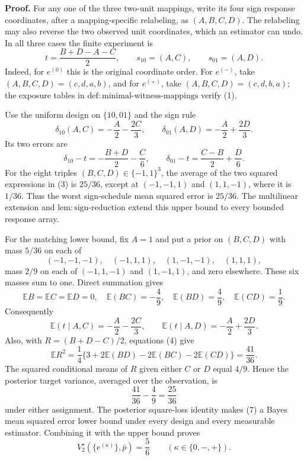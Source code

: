 \textbf{Proof.}
For any one of the three two-unit mappings, write its four sign response coordinates, after a mapping-specific relabeling, as \((A,B,C,D)\). The relabeling may also reverse the two observed unit coordinates, which an estimator can undo. In all three cases the finite experiment is
\[
 t=\frac{B+D-A-C}{2},\qquad
 s_{10}=(A,C),\qquad s_{01}=(A,D). \tag{1}
\]
Indeed, for \(e^{(0)}\) this is the original coordinate order. For \(e^{(-)}\), take \((A,B,C,D)=(c,d,a,b)\), and for \(e^{(+)}\), take \((A,B,C,D)=(c,d,b,a)\); the exposure tables in \(\mathrm{def{:}minimal\text{-}witness\text{-}mappings}\) verify (1).

Use the uniform design on \(\{10,01\}\) and the sign rule
\[
 \delta_{10}(A,C)=-\frac A2-\frac{2C}{3},
 \qquad
 \delta_{01}(A,D)=-\frac A2+\frac{2D}{3}. \tag{2}
\]
Its two errors are
\[
 \delta_{10}-t=-\frac{B+D}{2}-\frac C6,
 \qquad
 \delta_{01}-t=\frac{C-B}{2}+\frac D6. \tag{3}
\]
For the eight triples \((B,C,D)\in\{-1,1\}^3\), the average of the two squared expressions in (3) is \(25/36\), except at \((-1,-1,1)\) and \((1,1,-1)\), where it is \(1/36\). Thus the worst sign-schedule mean squared error is \(25/36\). The multilinear extension and \(\mathrm{lem{:}sign\text{-}reduction}\) extend this upper bound to every bounded response array.

For the matching lower bound, fix \(A=1\) and put a prior on \((B,C,D)\) with mass \(5/36\) on each of
\[
 (-1,-1,-1),\quad(-1,1,1),\quad(1,-1,-1),\quad(1,1,1),
\]
mass \(2/9\) on each of \((-1,1,-1)\) and \((1,-1,1)\), and zero elsewhere. These six masses sum to one. Direct summation gives
\[
 \mathbb E B=\mathbb E C=\mathbb E D=0,
 \quad
 \mathbb E(BC)=-\frac49,
 \quad
 \mathbb E(BD)=\frac49,
 \quad
 \mathbb E(CD)=\frac19. \tag{4}
\]
Consequently
\[
 \mathbb E(t\mid A,C)=-\frac A2-\frac{2C}{3},
 \qquad
 \mathbb E(t\mid A,D)=-\frac A2+\frac{2D}{3}. \tag{5}
\]
Also, with \(R=(B+D-C)/2\), equations (4) give
\[
 \mathbb E R^2
 =\frac14\{3+2\mathbb E(BD)-2\mathbb E(BC)-2\mathbb E(CD)\}
 =\frac{41}{36}. \tag{6}
\]
The squared conditional means of \(R\) given either \(C\) or \(D\) equal \(4/9\). Hence the posterior target variance, averaged over the observation, is
\[
 \frac{41}{36}-\frac49=\frac{25}{36} \tag{7}
\]
under either assignment. The posterior square-loss identity makes (7) a Bayes mean squared error lower bound under every design and every measurable estimator. Combining it with the upper bound proves
\[
 V_2^\star(\{e^{(\kappa)}\},\bar p)=\frac56
 \qquad(\kappa\in\{0,-,+\}). \tag{8}
\]

